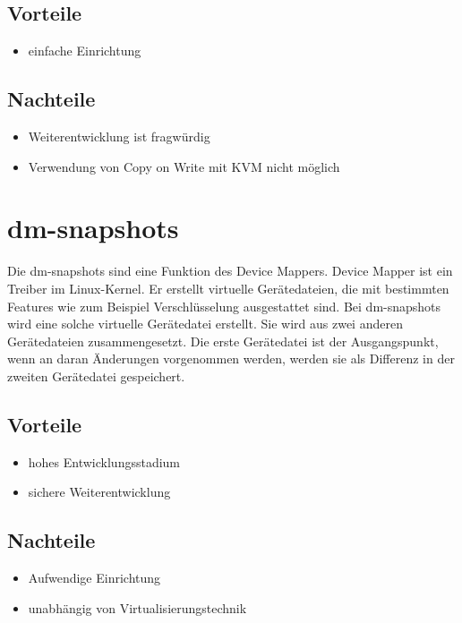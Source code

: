 \subsection{Vorteile}
\begin{itemize}
 \item einfache Einrichtung
\end{itemize}

\subsection{Nachteile}
\begin{itemize}
 \item Weiterentwicklung ist fragwürdig
 \item Verwendung von Copy on Write mit KVM nicht möglich
\end{itemize}

\section{dm-snapshots}
Die dm-snapshots sind eine Funktion des Device Mappers. Device Mapper ist ein Treiber im Linux-Kernel. Er erstellt virtuelle Gerätedateien, die mit bestimmten Features wie zum Beispiel Verschlüsselung ausgestattet sind. Bei dm-snapshots wird eine solche virtuelle Gerätedatei erstellt. Sie wird aus zwei anderen Gerätedateien zusammengesetzt. Die erste Gerätedatei ist der Ausgangspunkt, wenn an daran Änderungen vorgenommen werden, werden sie als Differenz in der zweiten Gerätedatei gespeichert. \cite{dmmbroz} \cite{dmkerneldoc}

\subsection{Vorteile}
\begin{itemize}
 \item hohes Entwicklungsstadium
 \item sichere Weiterentwicklung
\end{itemize}

\subsection{Nachteile}
\begin{itemize}
 \item Aufwendige Einrichtung
 \item unabhängig von Virtualisierungstechnik
\end{itemize}

